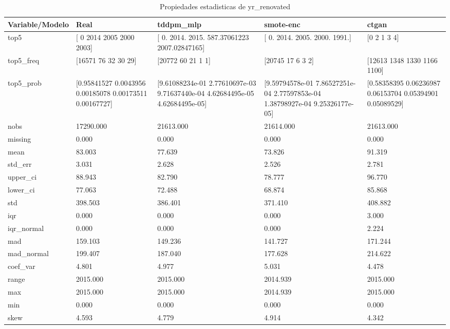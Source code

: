 \begin{table}[H]
\centering
\caption{Propiedades  estadisticas de yr_renovated}
\label{table-stats-yr_renovated}
\begin{tabular}{|l|m{10em}|m{10em}|m{10em}|m{10em}|}
\hline
 \rowcolor[gray]{0.8}
Variable/Modelo & Real & tddpm\_mlp & smote-enc & ctgan \\
\hline top5 & [   0 2014 2005 2000 2003] & [   0.         2014.         2015.          587.37061223 2007.02847165] & [   0. 2014. 2005. 2000. 1991.] & [0 2 1 3 4] \\
\hline top5\_freq & [16571    76    32    30    29] & [20772    60    21     1     1] & [20745    17     6     3     2] & [12613  1348  1330  1166  1100] \\
\hline top5\_prob & [0.95841527 0.0043956  0.00185078 0.00173511 0.00167727] & [9.61088234e-01 2.77610697e-03 9.71637440e-04 4.62684495e-05
 4.62684495e-05] & [9.59794578e-01 7.86527251e-04 2.77597853e-04 1.38798927e-04
 9.25326177e-05] & [0.58358395 0.06236987 0.06153704 0.05394901 0.05089529] \\
\hline nobs & 17290.000 & 21613.000 & 21614.000 & 21613.000 \\
\hline missing & 0.000 & 0.000 & 0.000 & 0.000 \\
\hline mean & 83.003 & 77.639 & 73.826 & 91.319 \\
\hline std\_err & 3.031 & 2.628 & 2.526 & 2.781 \\
\hline upper\_ci & 88.943 & 82.790 & 78.777 & 96.770 \\
\hline lower\_ci & 77.063 & 72.488 & 68.874 & 85.868 \\
\hline std & 398.503 & 386.401 & 371.410 & 408.882 \\
\hline iqr & 0.000 & 0.000 & 0.000 & 3.000 \\
\hline iqr\_normal & 0.000 & 0.000 & 0.000 & 2.224 \\
\hline mad & 159.103 & 149.236 & 141.727 & 171.244 \\
\hline mad\_normal & 199.407 & 187.040 & 177.628 & 214.622 \\
\hline coef\_var & 4.801 & 4.977 & 5.031 & 4.478 \\
\hline range & 2015.000 & 2015.000 & 2014.939 & 2015.000 \\
\hline max & 2015.000 & 2015.000 & 2014.939 & 2015.000 \\
\hline min & 0.000 & 0.000 & 0.000 & 0.000 \\
\hline skew & 4.593 & 4.779 & 4.914 & 4.342 \\

\end{tabular}
\end{table}
